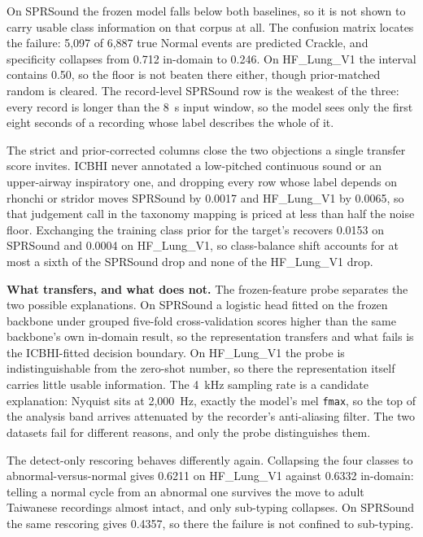 \documentclass[journal,onecolumn]{IEEEtran}
\newif\ifshownew
\newcommand{\added}[1]{\ifshownew\ul{#1}\else#1\fi}
\newenvironment{addedblock}{}{}
\begin{document}
\begin{addedblock}
\added{%
On SPRSound the frozen model falls below both baselines, so it is not shown to carry usable
class information on that corpus at all. The confusion matrix locates the failure: 5,097 of
6,887 true Normal events are predicted Crackle, and specificity collapses from 0.712 in-domain
to 0.246. On HF\_Lung\_V1 the interval contains 0.50, so the floor is not beaten there either,
though prior-matched random is cleared. The record-level SPRSound row is the weakest of the
three: every record is longer than the 8~s input window, so the model sees only the first eight
seconds of a recording whose label describes the whole of it.%
}

\added{%
The strict and prior-corrected columns close the two objections a single transfer score
invites. ICBHI never annotated a low-pitched continuous sound or an upper-airway inspiratory
one, and dropping every row whose label depends on rhonchi or stridor moves SPRSound by 0.0017
and HF\_Lung\_V1 by 0.0065, so that judgement call in the taxonomy mapping is priced at less
than half the noise floor. Exchanging the training class prior for the target's recovers 0.0153
on SPRSound and 0.0004 on HF\_Lung\_V1, so class-balance shift accounts for at most a sixth of
the SPRSound drop and none of the HF\_Lung\_V1 drop.%
}

\added{%
\textbf{What transfers, and what does not.} The frozen-feature probe separates the two possible
explanations. On SPRSound a logistic head fitted on the frozen backbone under grouped five-fold
cross-validation scores higher than the same backbone's own in-domain result, so the
representation transfers and what fails is the ICBHI-fitted decision boundary. On HF\_Lung\_V1
the probe is indistinguishable from the zero-shot number, so there the representation itself
carries little usable information. The 4~kHz sampling rate is a candidate explanation: Nyquist
sits at 2,000~Hz, exactly the model's mel \texttt{fmax}, so the top of the analysis band arrives
attenuated by the recorder's anti-aliasing filter. The two datasets fail for different reasons,
and only the probe distinguishes them.%
}

\added{%
The detect-only rescoring behaves differently again. Collapsing the four classes to
abnormal-versus-normal gives 0.6211 on HF\_Lung\_V1 against 0.6332 in-domain: telling a normal
cycle from an abnormal one survives the move to adult Taiwanese recordings almost intact, and
only sub-typing collapses. On SPRSound the same rescoring gives 0.4357, so there the failure is
not confined to sub-typing.%
}


\end{addedblock}
\end{document}

